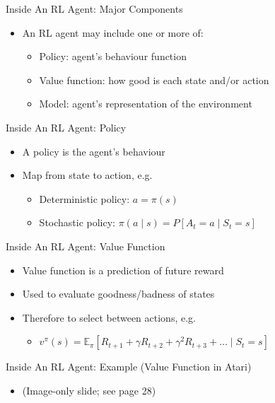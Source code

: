 \documentclass[presentation]{beamer}
\begin{document}
\begin{frame}[label={sec:org66a75aa}]{Inside An RL Agent: Major Components}
\begin{itemize}
\item An RL agent may include one or more of:
\begin{itemize}
\item Policy: agent’s behaviour function
\item Value function: how good is each state and/or action
\item Model: agent’s representation of the environment
\end{itemize}
\end{itemize}
\end{frame}
\begin{frame}[label={sec:org1fca901}]{Inside An RL Agent: Policy}
\begin{itemize}
\item A policy is the agent’s behaviour
\item Map from state to action, e.g.
\begin{itemize}
\item Deterministic policy: \(a = \pi(s)\)
\item Stochastic policy: \(\pi(a\mid s)=P[A_t=a\mid S_t=s]\)
\end{itemize}
\end{itemize}
\end{frame}
\begin{frame}[label={sec:org8c0bca8}]{Inside An RL Agent: Value Function}
\begin{itemize}
\item Value function is a prediction of future reward
\item Used to evaluate goodness/badness of states
\item Therefore to select between actions, e.g.
\begin{itemize}
\item \(v^\pi(s) = \mathbb{E}_\pi[ R_{t+1} + \gamma R_{t+2} + \gamma^2 R_{t+3} + \ldots \mid S_t=s]\)
\end{itemize}
\end{itemize}
\end{frame}
\begin{frame}[label={sec:org29e04e0}]{Inside An RL Agent: Example (Value Function in Atari)}
\begin{itemize}
\item (Image-only slide; see page 28)
\end{itemize}
\end{frame}
\end{document}
